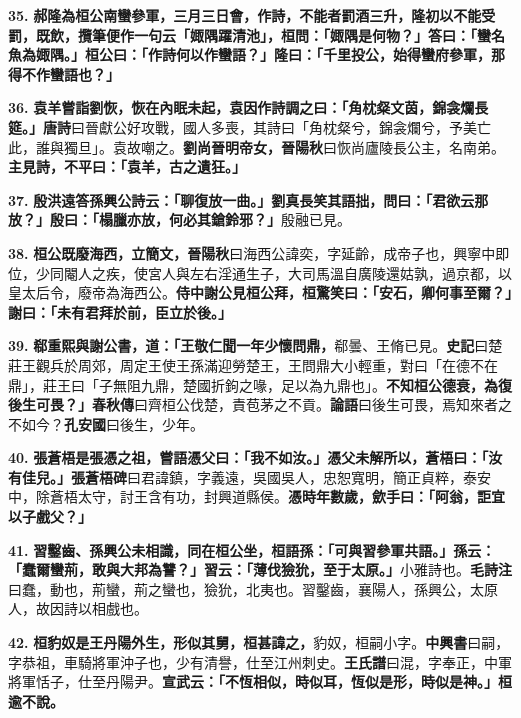 \textbf{35.} \textbf{郝隆為桓公南蠻參軍，三月三日會，作詩，不能者罰酒三升，隆初以不能受罰，既飲，攬筆便作一句云「娵隅躍清池」，桓問：「娵隅是何物？」答曰：「蠻名魚為娵隅。」桓公曰：「作詩何以作蠻語？」隆曰：「千里投公，始得蠻府參軍，那得不作蠻語也？」}

\textbf{36.} \textbf{袁羊嘗詣劉恢，恢在內眠未起，袁因作詩調之曰：「角枕粲文茵，錦衾爛長筵。」}{\footnotesize \textbf{唐詩}曰晉獻公好攻戰，國人多喪，其詩曰「角枕粲兮，錦衾爛兮，予美亡此，誰與獨旦」。袁故嘲之。}\textbf{劉尚晉明帝女，}{\footnotesize \textbf{晉陽秋}曰恢尚廬陵長公主，名南弟。}\textbf{主見詩，不平曰：「袁羊，古之遺狂。」}

\textbf{37.} \textbf{殷洪遠答孫興公詩云：「聊復放一曲。」劉真長笑其語拙，問曰：「君欲云那放？」殷曰：「榻臘亦放，何必其鎗鈴邪？」}{\footnotesize 殷融已見。}

\textbf{38.} \textbf{桓公既廢海西，立簡文，}{\footnotesize \textbf{晉陽秋}曰海西公諱奕，字延齡，成帝子也，興寧中即位，少同閹人之疾，使宮人與左右淫通生子，大司馬溫自廣陵還姑孰，過京都，以皇太后令，廢帝為海西公。}\textbf{侍中謝公見桓公拜，桓驚笑曰：「安石，卿何事至爾？」謝曰：「未有君拜於前，臣立於後。」}

\textbf{39.} \textbf{郗重熙與謝公書，道：「王敬仁聞一年少懷問鼎，}{\footnotesize 郗曇、王脩已見。\textbf{史記}曰楚莊王觀兵於周郊，周定王使王孫滿迎勞楚王，王問鼎大小輕重，對曰「在德不在鼎」，莊王曰「子無阻九鼎，楚國折鉤之喙，足以為九鼎也」。}\textbf{不知桓公德衰，為復後生可畏？」}{\footnotesize \textbf{春秋傳}曰齊桓公伐楚，責苞茅之不貢。\textbf{論語}曰後生可畏，焉知來者之不如今？\textbf{孔安國}曰後生，少年。}

\textbf{40.} \textbf{張蒼梧是張憑之祖，嘗語憑父曰：「我不如汝。」憑父未解所以，蒼梧曰：「汝有佳兒。」}{\footnotesize \textbf{張蒼梧碑}曰君諱鎮，字義遠，吳國吳人，忠恕寬明，簡正貞粹，泰安中，除蒼梧太守，討王含有功，封興道縣侯。}\textbf{憑時年數歲，歛手曰：「阿翁，詎宜以子戲父？」}

\textbf{41.} \textbf{習鑿齒、孫興公未相識，同在桓公坐，桓語孫：「可與習參軍共語。」孫云：「蠢爾蠻荊，敢與大邦為讐？」習云：「薄伐獫狁，至于太原。」}{\footnotesize 小雅詩也。\textbf{毛詩注}曰蠢，動也，荊蠻，荊之蠻也，獫狁，北夷也。習鑿齒，襄陽人，孫興公，太原人，故因詩以相戲也。}

\textbf{42.} \textbf{桓豹奴是王丹陽外生，形似其舅，桓甚諱之，}{\footnotesize 豹奴，桓嗣小字。\textbf{中興書}曰嗣，字恭祖，車騎將軍沖子也，少有清譽，仕至江州刺史。\textbf{王氏譜}曰混，字奉正，中軍將軍恬子，仕至丹陽尹。}\textbf{宣武云：「不恆相似，時似耳，恆似是形，時似是神。」桓逾不說。}

